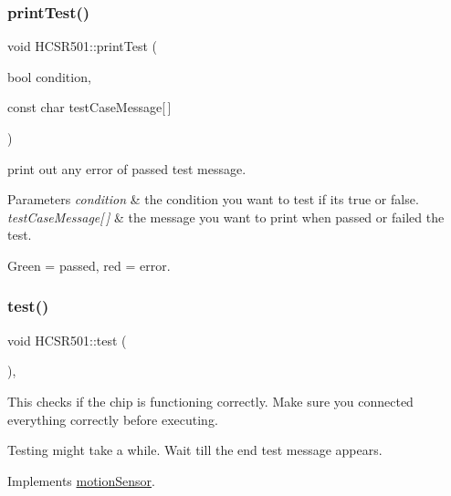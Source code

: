 \subsubsection{\texorpdfstring{print\+Test()}{printTest()}}
{\footnotesize\ttfamily void H\+C\+S\+R501\+::print\+Test (\begin{DoxyParamCaption}\item[{bool}]{condition,  }\item[{const char}]{test\+Case\+Message\mbox{[}$\,$\mbox{]} }\end{DoxyParamCaption})\hspace{0.3cm}{\ttfamily [private]}}



print out any error of passed test message. 


\begin{DoxyParams}{Parameters}
{\em condition} & the condition you want to test if it\textquotesingle{}s true or false. \\
\hline
{\em test\+Case\+Message\mbox{[}$\,$\mbox{]}} & the message you want to print when passed or failed the test.\\
\hline
\end{DoxyParams}
Green = passed, red = error. \mbox{\label{class_h_c_s_r501_ad90e8669ce7d60213c917c9213366798}} 
\subsubsection{\texorpdfstring{test()}{test()}}
{\footnotesize\ttfamily void H\+C\+S\+R501\+::test (\begin{DoxyParamCaption}{ }\end{DoxyParamCaption})\hspace{0.3cm}{\ttfamily [override]}, {\ttfamily [virtual]}}



This checks if the chip is functioning correctly. Make sure you connected everything correctly before executing. 

Testing might take a while. Wait till the end test message appears. 

Implements \mbox{\hyperlink{classmotion_sensor_a718bb6e111adc734ce6e595e28664581}{motion\+Sensor}}.

\mbox{\label{class_h_c_s_r501_ad300c0219deddb52c3a5e443be9a96cd}} 
